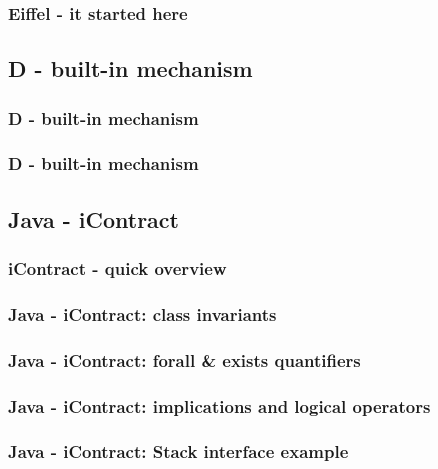 \documentclass{beamer}
\begin{document}
\begin{frame}[fragile]
\frametitle{Eiffel - it started here}

\end{frame}

\subsection{D - built-in mechanism}
\begin{frame}[fragile]
\frametitle{D - built-in mechanism}

\end{frame}

\begin{frame}[fragile]
\frametitle{D - built-in mechanism}

\end{frame}

\subsection{Java - iContract}
\begin{frame}[fragile]
\frametitle{iContract - quick overview}

\end{frame}

\begin{frame}[fragile]
\frametitle{Java - iContract: class invariants}

\end{frame}

\begin{frame}[fragile]
\frametitle{Java - iContract: forall \& exists quantifiers}


\end{frame}

\begin{frame}[fragile]
\frametitle{Java - iContract: implications and logical operators}


\end{frame}

\begin{frame}[fragile]
\frametitle{Java - iContract: Stack interface example}
\begin{columns}

\end{columns}
\end{frame}
\end{document}
